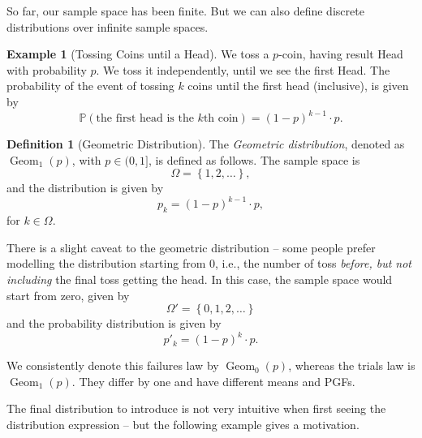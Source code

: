 \documentclass[11pt]{article}
\numberwithin{equation}{section}
\theoremstyle{definition}
\newtheorem{definition}[theorem]{Definition}
\newtheorem{example}[theorem]{Example}
\theoremstyle{remark}
\newcommand{\pqty}[1]{\left(#1\right)}
\newcommand{\Bqty}[1]{\left\{#1\right\}}
\newcommand{\ocintv}[2]{(#1,#2]}
\newcommand{\Prob}{\mathbb P}
\newcommand{\GeomOne}{\operatorname{Geom}_1}
\newcommand{\GeomZero}{\operatorname{Geom}_0}
\begin{document}
So far, our sample space has been finite. But we can also define discrete distributions over infinite sample spaces.

\begin{example}[Tossing Coins until a Head]\label{probability-example-017}
    \label{probability-ex:tossing-coins-until-head}%
    We toss a \(p\)-coin, having result Head with probability \(p\). We toss it independently, until we see the first Head. The probability of the event of tossing \(k\) coins until the first head (inclusive), is given by
    \[
        \Prob\pqty{\text{the first head is the }k\text{th coin}} = \pqty{1 - p}^{k - 1} \cdot p.
    \]
\end{example}

\begin{definition}[Geometric Distribution]\label{probability-definition-014}
    \label{probability-def:geometric-distribution}%
    The \emph{Geometric distribution}, denoted as \(\GeomOne\pqty{p}\), with \(p \in \ocintv{0}{1}\), is defined as follows. The sample space is
    \[
        \Omega = \Bqty{1, 2, \ldots},
    \]
    and the distribution is given by
    \[
        p_k = \pqty{1 - p}^{k - 1} \cdot p,
    \]
    for \(k \in \Omega\).
\end{definition}

There is a slight caveat to the geometric distribution -- some people prefer modelling the distribution starting from \(0\), i.e., the number of toss \emph{before, but not including} the final toss getting the head. In this case, the sample space would start from zero, given by
\[
    \Omega' = \Bqty{0, 1, 2, \ldots}
\]
and the probability distribution is given by
\[
    p'_k = \pqty{1 - p}^{k} \cdot p.
\]

We consistently denote this failures law by \(\GeomZero(p)\), whereas the trials law is \(\GeomOne(p)\). They differ by one and have different means and PGFs.

The final distribution to introduce is not very intuitive when first seeing the distribution expression -- but the following example gives a motivation.
\end{document}
